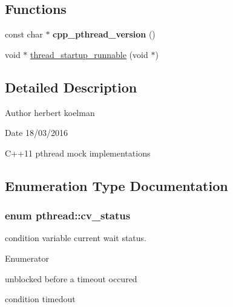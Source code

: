 \subsection*{Functions}
\begin{DoxyCompactItemize}
\item 
const char $\ast$ {\bfseries cpp\+\_\+pthread\+\_\+version} ()\hypertarget{namespacepthread_ad04d8bbcf57d64ba29047b53432a9ceb}{}\label{namespacepthread_ad04d8bbcf57d64ba29047b53432a9ceb}

\item 
void $\ast$ \hyperlink{namespacepthread_a4ca2138b7b0d82d63a05c708edd45a6f}{thread\+\_\+startup\+\_\+runnable} (void $\ast$)
\end{DoxyCompactItemize}


\subsection{Detailed Description}
\begin{DoxyAuthor}{Author}
herbert koelman 
\end{DoxyAuthor}
\begin{DoxyDate}{Date}
18/03/2016
\end{DoxyDate}
C++11 pthread mock implementations 

\subsection{Enumeration Type Documentation}
\subsubsection[{\texorpdfstring{cv\+\_\+status}{cv_status}}]{\setlength{\rightskip}{0pt plus 5cm}enum {\bf pthread\+::cv\+\_\+status}}\hypertarget{namespacepthread_a823f88a2bf448bd5bd5273b826830bdd}{}\label{namespacepthread_a823f88a2bf448bd5bd5273b826830bdd}
condition variable current wait status. \begin{Desc}
\item[Enumerator]\par
\begin{description}
\item[{\em 
no\+\_\+timeout\hypertarget{namespacepthread_a823f88a2bf448bd5bd5273b826830bdda633b1bc5140f77a22f2c26bea4fa3398}{}\label{namespacepthread_a823f88a2bf448bd5bd5273b826830bdda633b1bc5140f77a22f2c26bea4fa3398}
}]unblocked before a timeout occured \item[{\em 
timedout\hypertarget{namespacepthread_a823f88a2bf448bd5bd5273b826830bdda1c2d3e88a4ad820053c817753867b31a}{}\label{namespacepthread_a823f88a2bf448bd5bd5273b826830bdda1c2d3e88a4ad820053c817753867b31a}
}]condition timedout \end{description}
\end{Desc}
